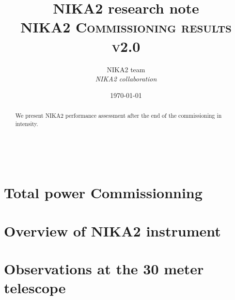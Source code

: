 \documentclass[a4paper, 11pt]{article} %
\title{\textbf{NIKA2 research note}\\   
\textsc{NIKA2 Commissioning results v2.0}} %
\author{NIKA2 team %
\\{\textit{NIKA2 collaboration}}} %
\date{\today} %
\makeatletter
\renewcommand{\maketitle}{ %
\begin{flushleft} %
{\LARGE\@title} %

\vspace{50pt} %

{\large\@author} %
\\\@date %

\vspace{40pt} %
\end{flushleft}
}
\makeatother
\begin{document}
\maketitle %
%
%
%
\tableofcontents

\newpage
\begin{abstract}
We present NIKA2 performance assessment after the end of the commissioning in intensity.
\end{abstract}



\newpage
%
%



\section{Total power Commissionning}
\label{se:intro}



\clearpage
\section{Overview of NIKA2 instrument}
\label{se:bandpasses}



\clearpage
\section{Observations at the 30 meter telescope}
\label{se:observation}

\end{document}
